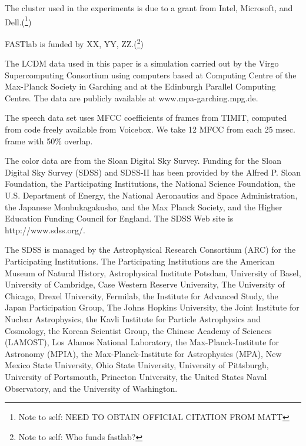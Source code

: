 \documentclass[twoside,leqno,twocolumn]{article}
\newcommand{\authornote}[1]{(\footnote{Note to self: #1})}
\newcommand{\authorsnote}[1]{\authornote{#1}}
\begin{document}
{\small
The cluster used in the experiments is due to a grant from Intel, Microsoft, and Dell.\authorsnote{NEED TO OBTAIN OFFICIAL CITATION FROM MATT}

FASTlab is funded by XX, YY, ZZ.\authorsnote{Who funds fastlab?}

The LCDM data used in this paper is a simulation carried out by the Virgo Supercomputing Consortium using computers based at Computing Centre of the Max-Planck Society in Garching and at the Edinburgh Parallel Computing Centre. The data are publicly available at www.mpa-garching.mpg.de.

The speech data set uses MFCC coefficients of frames from TIMIT, computed from code freely available from Voicebox.
We take 12 MFCC from each 25 msec. frame with 50\% overlap.

The color data are from the Sloan Digital Sky Survey.
Funding for the Sloan Digital Sky Survey (SDSS) and SDSS-II has been provided by the Alfred P. Sloan Foundation, the Participating Institutions, the National Science Foundation, the U.S. Department of Energy, the National Aeronautics and Space Administration, the Japanese Monbukagakusho, and the Max Planck Society, and the Higher Education Funding Council for England.
The SDSS Web site is http://www.sdss.org/.

The SDSS is managed by the Astrophysical Research Consortium (ARC) for the Participating Institutions.
The Participating Institutions are the American Museum of Natural History, Astrophysical Institute Potsdam, University of Basel, University of Cambridge, Case Western Reserve University, The University of Chicago, Drexel University, Fermilab, the Institute for Advanced Study, the Japan Participation Group, The Johns Hopkins University, the Joint Institute for Nuclear Astrophysics, the Kavli Institute for Particle Astrophysics and Cosmology, the Korean Scientist Group, the Chinese Academy of Sciences (LAMOST), Los Alamos National Laboratory, the Max-Planck-Institute for Astronomy (MPIA), the Max-Planck-Institute for Astrophysics (MPA), New Mexico State University, Ohio State University, University of Pittsburgh, University of Portsmouth, Princeton University, the United States Naval Observatory, and the University of Washington.
}




\end{document}
